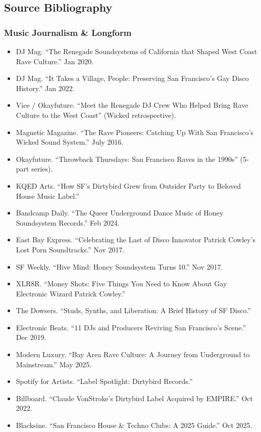 \documentclass[11pt,letterpaper]{article}
\begin{document}
\subsection{Source Bibliography}

\subsubsection{Music Journalism \& Longform}
\begin{itemize}[leftmargin=1.5em, itemsep=0pt]
  \item DJ Mag. ``The Renegade Soundsystems of California that Shaped West Coast Rave Culture.'' Jan 2020.
  \item DJ Mag. ``It Takes a Village, People: Preserving San Francisco's Gay Disco History.'' Jan 2022.
  \item Vice / Okayfuture. ``Meet the Renegade DJ Crew Who Helped Bring Rave Culture to the West Coast'' (Wicked retrospective).
  \item Magnetic Magazine. ``The Rave Pioneers: Catching Up With San Francisco's Wicked Sound System.'' July 2016.
  \item Okayfuture. ``Throwback Thursdays: San Francisco Raves in the 1990s'' (5-part series).
  \item KQED Arts. ``How SF's Dirtybird Grew from Outsider Party to Beloved House Music Label.''
  \item Bandcamp Daily. ``The Queer Underground Dance Music of Honey Soundsystem Records.'' Feb 2024.
  \item East Bay Express. ``Celebrating the Last of Disco Innovator Patrick Cowley's Lost Porn Soundtracks.'' Nov 2017.
  \item SF Weekly. ``Hive Mind: Honey Soundsystem Turns 10.'' Nov 2017.
  \item XLR8R. ``Money Shots: Five Things You Need to Know About Gay Electronic Wizard Patrick Cowley.''
  \item The Dowsers. ``Studs, Synths, and Liberation: A Brief History of SF Disco.''
  \item Electronic Beats. ``11 DJs and Producers Reviving San Francisco's Scene.'' Dec 2019.
  \item Modern Luxury. ``Bay Area Rave Culture: A Journey from Underground to Mainstream.'' May 2025.
  \item Spotify for Artists. ``Label Spotlight: Dirtybird Records.''
  \item Billboard. ``Claude VonStroke's Dirtybird Label Acquired by EMPIRE.'' Oct 2022.
  \item Blacksine. ``San Francisco House \& Techno Clubs: A 2025 Guide.'' Oct 2025.
\end{itemize}
\end{document}
